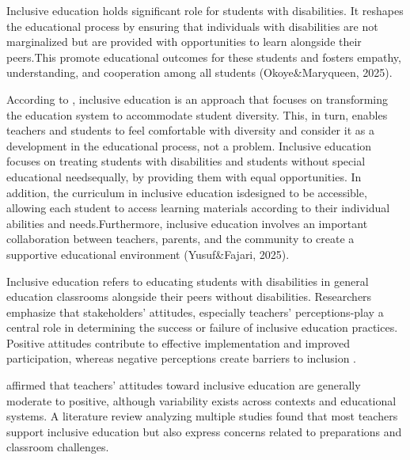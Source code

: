 \documentclass[10pt]{NSP1}
\begin{document}
Inclusive education holds significant role for students with disabilities. It reshapes the educational process by ensuring that individuals with disabilities are not marginalized but are provided with opportunities to learn alongside their peers.This promote educational outcomes for these students and fosters empathy, understanding, and cooperation among all students (Okoye\&Maryqueen, 2025).

According to \cite{13}, inclusive education is an approach that focuses on transforming the education system to accommodate student diversity. This, in turn, enables teachers and students to feel comfortable with diversity and consider it as a development in the educational process, not a problem. Inclusive education focuses on treating students with disabilities and students without special educational needsequally, by providing them with equal opportunities. In addition, the curriculum in inclusive education isdesigned to be accessible, allowing each student to access learning materials according to their individual abilities and needs.Furthermore, inclusive education involves an important collaboration between teachers, parents, and the community to create a supportive educational environment (Yusuf\&Fajari, 2025).

Inclusive education refers to educating students with disabilities in general education classrooms alongside their peers without disabilities. Researchers emphasize that stakeholders' attitudes, especially teachers' perceptions-play a central role in determining the success or failure of inclusive education practices. Positive attitudes contribute to effective implementation and improved participation, whereas negative perceptions create barriers to inclusion \cite{19}.

\cite{19} affirmed that teachers' attitudes toward inclusive education are generally moderate to positive, although variability exists across contexts and educational systems. A literature review analyzing multiple studies found that most teachers support inclusive education but also express concerns related to preparations and classroom challenges.
\end{document}
